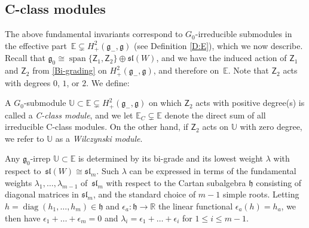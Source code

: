 \documentclass[10pt,a4paper]{amsart}
\DeclareMathOperator{\sn}{span}
\DeclareMathOperator{\diag}{diag}
\newcommand{\g}{\mathfrak{g}}
\newcommand{\fh}{\mathfrak{h}}
\newcommand\fsl{\mathfrak{sl}}
\newcommand{\R}{\mathbb{R}}
\newcommand\bbE{\mathbb{E}}
\newcommand\bbU{\mathbb{U}}
\newcommand\sfZ{\mathsf{Z}}
\numberwithin{equation}{section}
\begin{document}
 \subsection{C-class modules} \label{S:CM}

 The above fundamental invariants correspond to $G_0$-irreducible submodules in the effective part~$\bbE \subsetneq H^2_+(\g_-,\g)$ (see Definition \ref{D:E}), which we now describe.
Recall that $\g_0 \cong \sn \{\sfZ_1, \sfZ_2\} \oplus \fsl(W)$, and we have the induced action of $\sfZ_1$ and $\sfZ_2$ from \eqref{Bi-grading} on $H^2_+(\g_-,\g)$, and therefore on~$\bbE$. Note that $\sfZ_2$ acts with degrees $0$, $1$, or $2$. We define:

\begin{Definition}\label{D:C-classM}
A $G_0$-submodule $\bbU \subset \bbE \subsetneq H^2_+(\g_-,\g)$ on which $\sfZ_2$ acts with positive degree(s) is called a {\em C-class module}, and we let $\bbE_C \subsetneq \bbE$ denote the direct sum of all irreducible C-class modules. On the other hand, if $\sfZ_2$ acts on $\bbU$ with zero degree, we refer to $\bbU$ as a {\em Wilczynski module}.
\end{Definition}

Any $\g_{0}$-irrep $\bbU \subset \bbE$ is determined by its bi-grade and its lowest weight $\lambda$ with respect to~$\fsl(W) \cong \fsl_m$. Such $\lambda$ can be expressed in terms of the fundamental weights $\lambda_1, \dots, \lambda_{m-1}$ of~$\fsl_m$ with respect to the Cartan subalgebra $\fh$ consisting of diagonal matrices in $\fsl_m$, and the standard choice of $m-1$ simple roots. Letting $h = \diag (h_1, \dots,h_m) \in \fh$ and $\epsilon_a\colon \fh \to \R$ the linear functional $\epsilon_a(h) = h_a$, we then have $\epsilon_1 +\dots+ \epsilon_m = 0$ and $\lambda_i = \epsilon_1 + \dots + \epsilon_i$ for $1 \leq i \leq m-1$.
\end{document}
